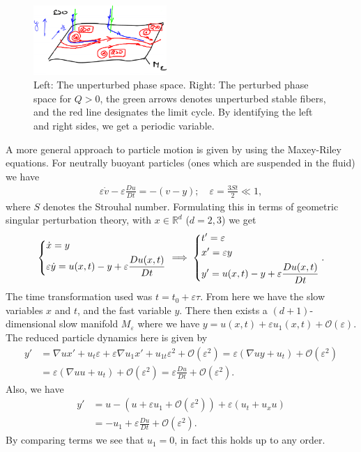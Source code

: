 \begin{ex}
\begin{figure}[h!]
	\includegraphics[width=0.45\textwidth]{figures/ch9/23b_Qpos_clustering.png}
	\caption{Left: The unperturbed phase space. Right: The perturbed phase space for $Q>0$, the green arrows denotes unperturbed stable fibers, and the red line designates the limit cycle. By identifying the left and right sides, we get a periodic variable.}
	\label{fig:clustering_Qpos}
\end{figure}

A more general approach to particle motion is given by \cite{Sapsis2008} using the Maxey-Riley equations. For neutrally buoyant particles (ones which are suspended in the fluid) we have
\begin{align}
	\varepsilon \dot{v} - \varepsilon \frac{Du}{Dt} = -(v-y);\quad \varepsilon = \frac{3St}{2}\ll 1, \label{eq9:maxeyriley}	
\end{align}
where $S$ denotes the Strouhal number. Formulating this in terms of geometric singular perturbation theory, with $x \in \mathbb{R}^{d}$ ($d=2,3$) we get
\begin{align}
	\begin{dcases}
		\dot{x} = y\\
		\varepsilon \dot{y} = u(x,t) - y + \varepsilon \frac{Du(x,t)}{Dt}	
	\end{dcases}
\implies
\begin{dcases}
	t' = \varepsilon \\
	x' = \varepsilon y \\
	y' = u(x,t) - y + \varepsilon \frac{Du(x,t)}{Dt}
\end{dcases}
.
\end{align}
The time transformation used was $t = t_0 + \varepsilon \tau$. From here we have the slow variables $x$ and $t$, and the fast variable $y$. There then exists a $(d+1)$-dimensional slow manifold $M_\varepsilon$ where we have $y = u(x,t) + \varepsilon u_1(x,t) + \mathcal{O}(\varepsilon)$. The reduced particle dynamics here is given by
\begin{align}
	y' &= \nabla u x' + u_t \varepsilon + \varepsilon \nabla u_1 x' + u_{1t}\varepsilon^{2} + \mathcal{O}(\varepsilon^{2}) 
	= \varepsilon(\nabla uy + u_{t}) + \mathcal{O}(\varepsilon^{2}) \\
	   &= \varepsilon (\nabla u u + u_{t}) + \mathcal{O}(\varepsilon^{2}) 
	   = \varepsilon \frac{Du}{Dt} + \mathcal{O}(\varepsilon^{2}).
\end{align}
Also, we have 
\begin{align}
	y' &= u - \left( u + \varepsilon u_{1} + \mathcal{O}(\varepsilon^{2}) \right) + \varepsilon \left( u_{t} + u_{x}u \right) \\
	   &=-u_{1} + \varepsilon \frac{Du}{Dt} + \mathcal{O}(\varepsilon^{2}).
\end{align}
By  comparing terms we see that $u_{1} =0$, in fact this holds up to any order. 


\end{ex}
